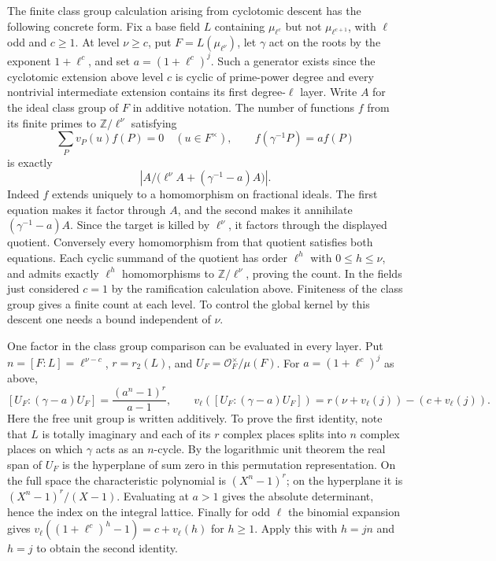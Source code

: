 \documentclass[11pt]{amsart}
\theoremstyle{definition}
\theoremstyle{remark}
\begin{document}
The finite class group calculation arising from cyclotomic descent
has the following concrete form. Fix a base field $L$ containing
$\mu_{\ell^c}$ but not $\mu_{\ell^{c+1}}$, with $\ell$ odd and $c\ge1$.
At level $\nu\ge c$, put $F=L(\mu_{\ell^\nu})$, let $\gamma$ act
on the roots by the exponent $1+\ell^c$, and set $a=(1+\ell^c)^j$.
Such a generator exists since the cyclotomic extension above level $c$
is cyclic of prime-power degree and every nontrivial intermediate
extension contains its first degree-$\ell$ layer. Write $A$ for the
ideal class group of $F$ in additive notation. The number of functions
$f$ from its finite primes to $\mathbb Z/\ell^\nu$ satisfying
\[
 \sum_P v_P(u)f(P)=0\quad(u\in F^\times),\qquad
 f(\gamma^{-1}P)=a f(P)
\]
is exactly
\[
 \left|A\big/\big(\ell^\nu A+(\gamma^{-1}-a)A\big)\right|.
\]
Indeed $f$ extends uniquely to a homomorphism on fractional ideals.
The first equation makes it factor through $A$, and the second makes
it annihilate $(\gamma^{-1}-a)A$. Since the target is killed by
$\ell^\nu$, it factors through the displayed quotient. Conversely
every homomorphism from that quotient satisfies both equations.
Each cyclic summand of the quotient has order $\ell^h$ with
$0\le h\le\nu$, and admits exactly $\ell^h$ homomorphisms to
$\mathbb Z/\ell^\nu$, proving the count. In the fields just considered
$c=1$ by the ramification calculation above. Finiteness of the class
group gives a finite count at each level. To control the global kernel
by this descent one needs a bound independent of $\nu$.

One factor in the class group comparison can be evaluated in every
layer. Put $n=[F:L]=\ell^{\nu-c}$, $r=r_2(L)$, and
$U_F=\mathcal O_F^\times/\mu(F)$. For $a=(1+\ell^c)^j$ as above,
\[
 [U_F:(\gamma-a)U_F]=\frac{(a^n-1)^r}{a-1},
 \qquad
 v_\ell([U_F:(\gamma-a)U_F])
 =r(\nu+v_\ell(j))-(c+v_\ell(j)).
\]
Here the free unit group is written additively. To prove the first
identity, note that $L$ is totally imaginary and each of its $r$
complex places splits into $n$ complex places on which $\gamma$ acts
as an $n$-cycle. By the logarithmic unit theorem the real span of
$U_F$ is the hyperplane of sum zero in this permutation representation.
On the full space the characteristic polynomial is $(X^n-1)^r$;
on the hyperplane it is $(X^n-1)^r/(X-1)$. Evaluating at $a>1$
gives the absolute determinant, hence the index on the integral
lattice. Finally for odd $\ell$ the binomial expansion gives
$v_\ell((1+\ell^c)^h-1)=c+v_\ell(h)$ for $h\ge1$.
Apply this with $h=jn$ and $h=j$ to obtain the second identity.
\end{document}
